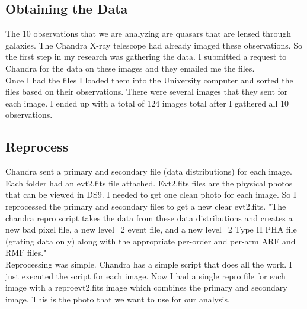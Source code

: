 \documentclass[12pt]{report}
\begin{document}
\subsection{Obtaining the Data}
The 10 observations that we are analyzing are quasars that are lensed through galaxies. The Chandra X-ray telescope had already imaged these observations. So the first step in my research was gathering the data. I submitted a request to Chandra for the data on these images and they emailed me the files.\\
Once I had the files I loaded them into the University computer and sorted the files based on their observations. There were several images that they sent for each image. I ended up with a total of 124 images total after I gathered all 10 observations. 
\subsection{Reprocess}
Chandra sent a primary and secondary file (data distributions) for each image. Each folder had an evt2.fits file attached. Evt2.fits files are the physical photos that can be viewed in DS9. I needed to get one clean photo for each image. So I reprocessed the primary and secondary files to get a new clear evt2.fits. "The chandra \textunderscore repro script takes the data from these data distributions and creates a new bad pixel file, a new level=2 event file, and a new level=2 Type II PHA file (grating data only) along with the appropriate per-order and per-arm ARF and RMF files.\cite{Chandra_2023}"\\
Reprocessing was simple. Chandra has a simple script that does all the work. I just executed the script for each image. Now I had a single repro file for each image with a repro\textunderscore evt2.fits image which combines the primary and secondary image. This is the photo that we want to use for our analysis. 
\end{document}
